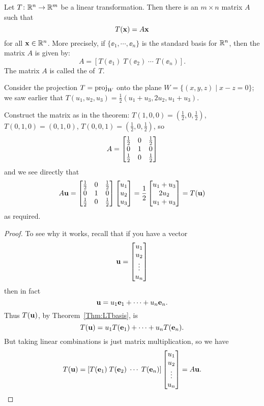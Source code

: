 \begin{theorem}\label{thm:standt_mat}

Let $T \colon \mathbb{R}^n \to \mathbb{R}^m$ be a linear transformation.  Then
there is an $m\times n$ matrix $A$ such that
$$
T(\mathbf{x}) = A\mathbf{x}
$$
for all $\mathbf{x} \in \mathbb{R}^n$.  More precisely, if $\{\ee_1, \cdots, \ee_n\}$
is the standard basis for $\mathbb{R}^n$, then the matrix $A$ is
given by:
$$
A = \left[ T(\ee_1) \;  T(\ee_2)\; \cdots \;   T(\ee_n)\right].
$$
The matrix $A$ is called the  of $\,T$.
 \end{theorem}



\begin{myexample}
Consider the projection $T = \operatorname{proj}_W$ onto the plane $W = \{(x,y,z)\mid x-z=0\}$; we saw earlier that $T(u_1, u_2,u_3) = \frac12(u_1+u_3,2u_2,u_1+u_3)$.

Construct the matrix as in the theorem:  $T(1,0,0) = (\frac12,0,\frac12)$, $T(0,1,0) = (0,1,0)$, $T(0,0,1) = (\frac12,0,\frac12)$, so
$$
A = \left[ \begin{matrix} \frac12 & 0 & \frac12\\ 0 & 1 & 0\\ \frac12 & 0 & \frac12 \end{matrix} \right]
$$
and we see directly that
$$
A\mathbf{u} =  \left[ \begin{matrix} \frac12 & 0 & \frac12\\ 0 & 1 & 0\\ \frac12 & 0 & \frac12 \end{matrix} \right]\left[ \begin{matrix} u_1\\u_2\\u_3 \end{matrix} \right] = \frac12\left[ \begin{matrix} u_1+u_3\\2u_2\\u_1+u_3 \end{matrix} \right] = T(\mathbf{u})
$$
as required.

 
\end{myexample}

\begin{proof}
To see why it works, recall that if you have a vector
$$\mathbf{u} = \left[ \begin{matrix} u_1 \\ u_2 \\ \vdots \\ u_n \end{matrix} \right]
$$
then in fact 
$$
\mathbf{u} = u_1\mathbf{e}_1 + \cdots + u_n\mathbf{e}_n.
$$
Thus $T(\mathbf{u})$, by Theorem~\ref{Thm:LTbasis}, %
is 
$$
T(\mathbf{u}) = u_1 T(\mathbf{e}_1) + \cdots + u_nT(\mathbf{e}_n).
$$
But taking linear combinations is just matrix multiplication,
so we have
$$
T(\mathbf{u}) = \left[ T(\mathbf{e}_1) \;  T(\mathbf{e}_2)\; \cdots \;   T(\mathbf{e}_n)\right]
\left[ \begin{matrix} u_1 \\ u_2 \\ \vdots \\ u_n \end{matrix} \right] = A\mathbf{u}.
$$
\end{proof}


